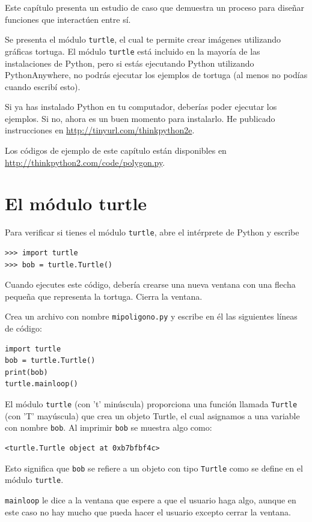 \documentclass[10pt]{book}
\begin{document}
Este capítulo presenta un estudio de caso que demuestra un proceso para
diseñar funciones que interactúen entre sí.

Se presenta el módulo {\tt turtle}, el cual te permite
crear imágenes utilizando gráficas tortuga.  El módulo {\tt turtle}
está incluido en la mayoría de las instalaciones de Python, pero si estás ejecutando Python
utilizando PythonAnywhere, no podrás ejecutar los ejemplos de tortuga (al
menos no podías cuando escribí esto).

Si ya has instalado Python en tu computador, deberías
poder ejecutar los ejemplos.  Si no, ahora es un buen momento
para instalarlo.  He publicado instrucciones en
\url{http://tinyurl.com/thinkpython2e}.

Los códigos de ejemplo de este capítulo están disponibles en
\url{http://thinkpython2.com/code/polygon.py}.


\section{El módulo turtle}
\label{turtle}

Para verificar si tienes el módulo {\tt turtle}, abre el intérprete de Python
y escribe

\begin{verbatim}
>>> import turtle
>>> bob = turtle.Turtle()
\end{verbatim}

Cuando ejecutes este código, debería crearse una nueva ventana
con una flecha pequeña que representa la tortuga.  Cierra la ventana.

Crea un archivo con nombre {\tt mipoligono.py} y escribe en él las siguientes
líneas de código:

\begin{verbatim}
import turtle
bob = turtle.Turtle()
print(bob)
turtle.mainloop()
\end{verbatim}
%
El módulo {\tt turtle} (con 't' minúscula) proporciona una función
llamada {\tt Turtle} (con 'T' mayúscula) que crea un objeto Turtle,
el cual asignamos a una variable con nombre {\tt bob}.
Al imprimir {\tt bob} se muestra algo como:

\begin{verbatim}
<turtle.Turtle object at 0xb7bfbf4c>
\end{verbatim}
%
Esto significa que {\tt bob} se refiere a un objeto con tipo
{\tt Turtle}
como se define en el módulo {\tt turtle}.

\verb"mainloop" le dice a la ventana que espere a que el usuario
haga algo, aunque en este caso no hay mucho que pueda hacer
el usuario excepto cerrar la ventana.
\end{document}
